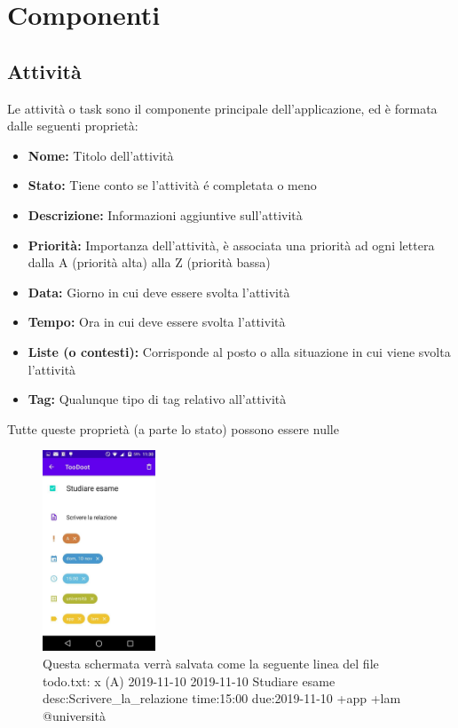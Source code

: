 \documentclass[]{article}
\providecommand{\tightlist}{%
  \setlength{\itemsep}{0pt}\setlength{\parskip}{0pt}}
\begin{document}
\hypertarget{componenti}{%
\section{Componenti}\label{componenti}}

\hypertarget{attivitaux300}{%
\subsection{Attività}\label{attivitaux300}}

Le attività o task sono il componente principale dell'applicazione, ed è
formata dalle seguenti proprietà:

\begin{itemize}
\tightlist
\item
  \textbf{Nome:} Titolo dell'attività
\item
  \textbf{Stato:} Tiene conto se l'attività é completata o meno
\item
  \textbf{Descrizione:} Informazioni aggiuntive sull'attività
\item
  \textbf{Priorità:} Importanza dell'attività, è associata una priorità
  ad ogni lettera dalla A (priorità alta) alla Z (priorità bassa)
\item
  \textbf{Data:} Giorno in cui deve essere svolta l'attività
\item
  \textbf{Tempo:} Ora in cui deve essere svolta l'attività
\item
  \textbf{Liste (o contesti):} Corrisponde al posto o alla situazione in
  cui viene svolta l'attività
\item
  \textbf{Tag:} Qualunque tipo di tag relativo all'attività
\end{itemize}

Tutte queste proprietà (a parte lo stato) possono essere nulle

\begin{figure}
\centering
\includegraphics[width=0.3\textwidth,height=0.1\textheight]{./img/schermata_edit.jpg}
\caption{Questa schermata verrà salvata come la seguente linea del file
todo.txt: x (A) 2019-11-10 2019-11-10 Studiare esame
desc:Scrivere\_la\_relazione time:15:00 due:2019-11-10 +app +lam
@università}
\end{figure}
\end{document}
